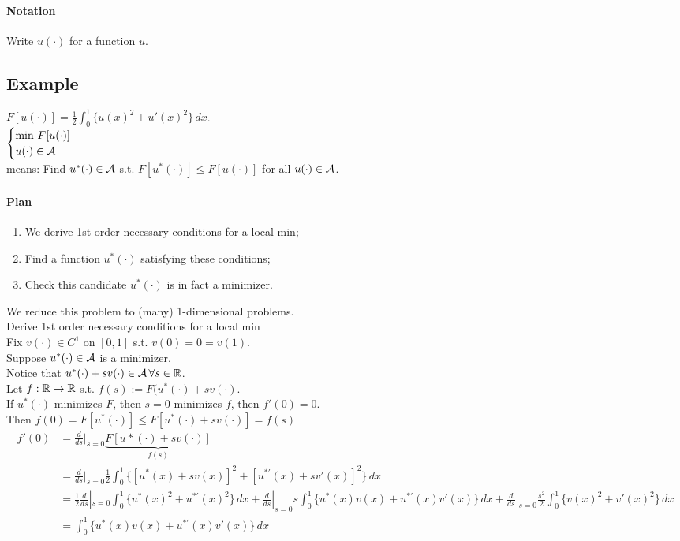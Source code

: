 \documentclass[11pt]{article}
\begin{document}
\paragraph{Notation}
Write $u(\cdot)$ for a function $u$.
\subsection{Example}
$F[u(\cdot)] = \frac{1}{2} \int_0^1 \{ u(x)^2 + u'(x)^2\} \, dx$.\\
$ \begin{cases}
	\min \, F[u(\cdot)] \\
	u(\cdot) \in \mathcal{A}
\end{cases}$\\
means: Find $u^*(\cdot) \in \mathcal{A}$ s.t. $F[u^*(\cdot)] \leq F[u(\cdot)]$ for all $u(\cdot) \in \mathcal{A}$.
\paragraph{Plan}
\begin{enumerate}
	\item We derive 1st order necessary conditions for a local min;
	\item Find a function $u^*(\cdot)$ satisfying these conditions;
	\item Check this candidate $u^*(\cdot)$ is in fact a minimizer.
\end{enumerate}
We reduce this problem to (many) 1-dimensional problems. \\
 Derive 1st order necessary conditions for a local min \\
Fix $v(\cdot) \in C^1$ on $[0,1]$ s.t. $v(0) = 0 = v(1)$. \\
Suppose $u^*(\cdot) \in \mathcal{A}$ is a minimizer. \\
Notice that $u^*(\cdot) + sv(\cdot) \in \mathcal{A}\, \forall s \in \mathbb{R}$. \\
Let $f: \mathbb{R} \rightarrow \mathbb{R}$ s.t. $f(s) := F(u^*(\cdot) + sv(\cdot)$. \\
If $u^*(\cdot)$ minimizes $F$, then $s=0$ minimizes $f$, then $f'(0) = 0$. \\
Then $f(0) = F[u^*(\cdot)] \leq F[u^*(\cdot) + sv(\cdot)] = f(s)$ \\
\begin{align}
	f'(0) &= \frac{d}{ds}|_{s=0} \underbrace{F[u*(\cdot) + sv(\cdot)]}_{f(s)} \\
	&= \frac{d}{ds}|_{s=0} \frac{1}{2} \int_0^1 \{ [u^*(x) + sv(x)]^2 + [u^{*'}(x) + sv'(x)]^2\} \, dx \\
	&= \frac{1}{2}\frac{d}{ds}|_{s=0} \int_0^1 \{ u^*(x)^2 + u^{*'}(x)^2\} \, dx + \frac{d}{ds}|_{s=0} s \int_0^1 \{u^*(x)v(x) + u^{*'}(x)v'(x)\} \, dx + \frac{d}{ds}|_{s=0} \frac{s^2}{2} \int_0^1 \{v(x)^2 + v'(x)^2\} \, dx \\
	&= \int_0^1 \{u^*(x)v(x) + u^{*'}(x)v'(x)\} \, dx
\end{align}
\end{document}
